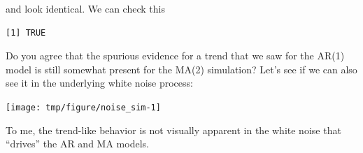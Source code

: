 \begin{frame}[fragile]
 and  look identical. We can check this
\begin{knitrout}\small
{}\color{fgcolor}\begin{kframe}
\begin{alltt}
\hlopt{==}
\end{alltt}
\begin{verbatim}
[1] TRUE
\end{verbatim}
\end{kframe}
\end{knitrout}

Do you agree that the spurious evidence for a trend that we saw for the AR(1) model is still somewhat present for the MA(2) simulation? Let's see if we can also see it in the underlying white noise process:

\begin{knitrout}\small
{}\color{fgcolor}\begin{kframe}
\begin{alltt}
 \hlkwb{<-} 
\hlstd{(}\hlstd{)}
 \hlkwb{<-} 
\hlstd{=}\hlstd{)}
\end{alltt}
\end{kframe}
\end{knitrout}

\vspace{-2mm}

\begin{knitrout}\small
{}\color{fgcolor}

{\centering \texttt{[image: tmp/figure/noise\_sim-1]} 

}


\end{knitrout}

To me, the trend-like behavior is not visually apparent in the white noise that ``drives'' the AR and MA models.

\end{frame} 


